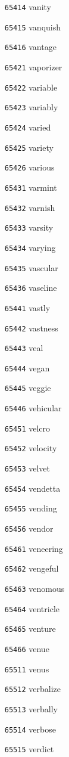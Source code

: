 \documentclass[twoside,11pt]{article}
\begin{document}
\begin{multicols}{5}
\begin{enumerate}
\item[\texttt{65414}] vanity
\item[\texttt{65415}] vanquish
\item[\texttt{65416}] vantage
\item[\texttt{65421}] vaporizer
\item[\texttt{65422}] variable
\item[\texttt{65423}] variably
\item[\texttt{65424}] varied
\item[\texttt{65425}] variety
\item[\texttt{65426}] various
\item[\texttt{65431}] varmint
\item[\texttt{65432}] varnish
\item[\texttt{65433}] varsity
\item[\texttt{65434}] varying
\item[\texttt{65435}] vascular
\item[\texttt{65436}] vaseline
\item[\texttt{65441}] vastly
\item[\texttt{65442}] vastness
\item[\texttt{65443}] veal
\item[\texttt{65444}] vegan
\item[\texttt{65445}] veggie
\item[\texttt{65446}] vehicular
\item[\texttt{65451}] velcro
\item[\texttt{65452}] velocity
\item[\texttt{65453}] velvet
\item[\texttt{65454}] vendetta
\item[\texttt{65455}] vending
\item[\texttt{65456}] vendor
\item[\texttt{65461}] veneering
\item[\texttt{65462}] vengeful
\item[\texttt{65463}] venomous
\item[\texttt{65464}] ventricle
\item[\texttt{65465}] venture
\item[\texttt{65466}] venue
\item[\texttt{65511}] venus
\item[\texttt{65512}] verbalize
\item[\texttt{65513}] verbally
\item[\texttt{65514}] verbose
\item[\texttt{65515}] verdict

\end{enumerate}
\end{multicols}
\end{document}
